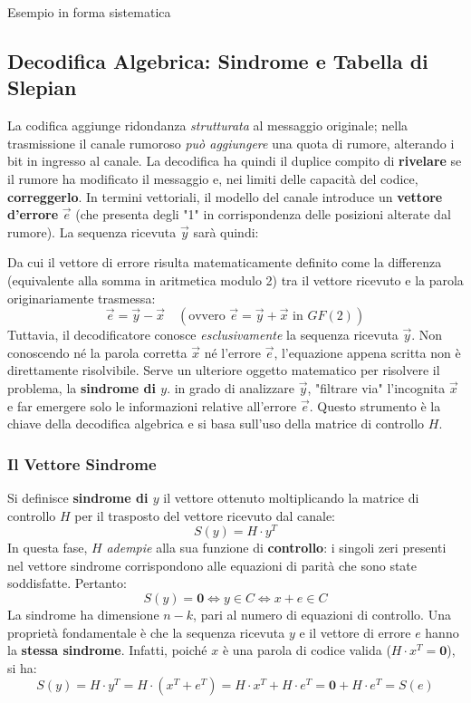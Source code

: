 \begin{esempio}{Esempio in forma sistematica}
\end{esempio}

\subsection{Decodifica Algebrica: Sindrome e Tabella di Slepian}
La codifica aggiunge ridondanza \textit{strutturata} al messaggio originale; nella trasmissione il canale rumoroso \textit{può aggiungere} una quota di rumore, alterando i bit in ingresso al canale. La decodifica ha quindi il duplice compito di \textbf{rivelare} se il rumore ha modificato il messaggio e, nei limiti delle capacità del codice, \textbf{correggerlo}.
In termini vettoriali, il modello del canale introduce un \textbf{vettore d'errore} $\vec{e}$ (che presenta degli "1" in corrispondenza delle posizioni alterate dal rumore). La sequenza ricevuta $\vec{y}$ sarà quindi:



Da cui il vettore di errore risulta matematicamente definito come la differenza (equivalente alla somma in aritmetica modulo 2) tra il vettore ricevuto e la parola originariamente trasmessa:
\[ \vec{e} = \vec{y} - \vec{x} \quad (\text{ovvero } \vec{e} = \vec{y} + \vec{x} \text{ in } GF(2)) \]
Tuttavia, il decodificatore conosce \textit{esclusivamente} la sequenza ricevuta $\vec{y}$. Non conoscendo né la parola corretta $\vec{x}$ né l'errore $\vec{e}$, l'equazione appena scritta non è direttamente risolvibile.
Serve un ulteriore oggetto matematico per risolvere il problema, la \textbf{sindrome di $y$}. in grado di analizzare $\vec{y}$, "filtrare via" l'incognita $\vec{x}$ e far emergere solo le informazioni relative all'errore $\vec{e}$. Questo strumento è la chiave della decodifica algebrica e si basa sull'uso della matrice di controllo $H$.

\subsubsection{Il Vettore Sindrome}
Si definisce \textbf{sindrome di $y$} il vettore ottenuto moltiplicando la matrice di controllo $H$ per il trasposto del vettore ricevuto dal canale:
\[ S(y) = H \cdot y^T \]
In questa fase, $H$ \textit{adempie} alla sua funzione di \textbf{controllo}: i singoli zeri presenti nel vettore sindrome corrispondono alle equazioni di parità che sono state soddisfatte. Pertanto:
\[ S(y) = \mathbf{0} \iff y \in C \iff x+e \in C \]
La sindrome ha dimensione $n-k$, pari al numero di equazioni di controllo.
Una proprietà fondamentale è che la sequenza ricevuta $y$ e il vettore di errore $e$ hanno la \textbf{stessa sindrome}. Infatti, poiché $x$ è una parola di codice valida ($H \cdot x^T = \mathbf{0}$), si ha:
\[ S(y) = H \cdot y^T = H \cdot (x^T+e^T) = H\cdot x^T + H \cdot e^T = \mathbf{0} + H \cdot e^T = S(e) \]

